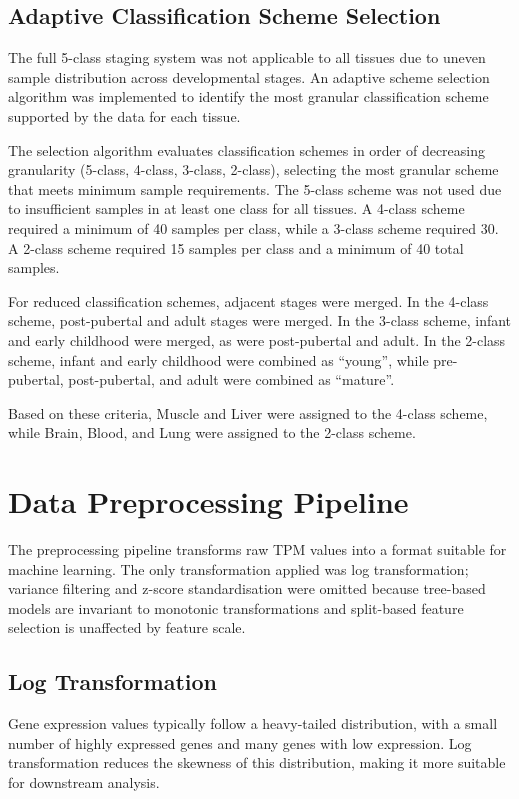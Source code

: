\subsection{Adaptive Classification Scheme Selection}

The full 5-class staging system was not applicable to all tissues due to uneven sample distribution across developmental stages. An adaptive scheme selection algorithm was implemented to identify the most granular classification scheme supported by the data for each tissue.

The selection algorithm evaluates classification schemes in order of decreasing granularity (5-class, 4-class, 3-class, 2-class), selecting the most granular scheme that meets minimum sample requirements. The 5-class scheme was not used due to insufficient samples in at least one class for all tissues. A 4-class scheme required a minimum of 40 samples per class, while a 3-class scheme required 30. A 2-class scheme required 15 samples per class and a minimum of 40 total samples.

For reduced classification schemes, adjacent stages were merged. In the 4-class scheme, post-pubertal and adult stages were merged. In the 3-class scheme, infant and early childhood were merged, as were post-pubertal and adult. In the 2-class scheme, infant and early childhood were combined as ``young'', while pre-pubertal, post-pubertal, and adult were combined as ``mature''.

Based on these criteria, Muscle and Liver were assigned to the 4-class scheme, while Brain, Blood, and Lung were assigned to the 2-class scheme.


\section{Data Preprocessing Pipeline}\label{sec:methods:preprocessing}

The preprocessing pipeline transforms raw TPM values into a format suitable for machine learning. The only transformation applied was log transformation; variance filtering and z-score standardisation were omitted because tree-based models are invariant to monotonic transformations and split-based feature selection is unaffected by feature scale.

\subsection{Log Transformation}

Gene expression values typically follow a heavy-tailed distribution, with a small number of highly expressed genes and many genes with low expression. Log transformation reduces the skewness of this distribution, making it more suitable for downstream analysis.


